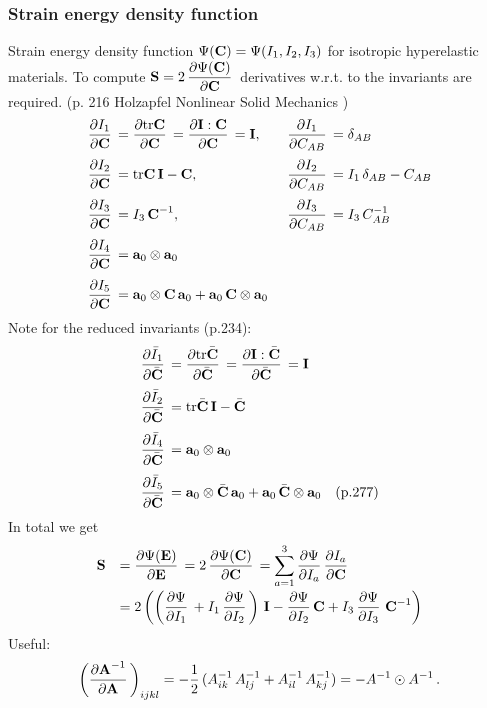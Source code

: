 \subsubsection{Strain energy density function}
Strain energy density function $\Psi(\textbf{C}) = \Psi(I_1, I_2, I_3)$ for isotropic hyperelastic materials. To compute $\bfS = 2\,\p{\Psi(\bfC)}{\bfC}$ derivatives w.r.t. to the invariants are required. (p. 216 Holzapfel Nonlinear Solid Mechanics  \cite{holzapfel2000nonlinear})
\begin{equation*}
  \begin{array}{lll}
    \p{I_1}{\bfC} = \p{\tr\bfC}{\bfC} = \p{\bfI:\bfC}{\bfC} = \bfI, \quad &\p{I_1}{C_{AB}} = \delta_{AB}\\[4mm]
    \p{I_2}{\bfC} = \tr \bfC\,\bfI - \bfC, \quad &\p{I_2}{C_{AB}} = I_1\,\delta_{AB} - C_{AB}\\[4mm]
    \p{I_3}{\bfC} = I_3\,\bfC^{-1}, \quad &\p{I_3}{C_{AB}} = I_3\,C^{-1}_{AB}\\[4mm]
    \p{I_4}{\bfC} = \bfa_0 \otimes \bfa_0\\[4mm]
    \p{I_5}{\bfC} = \bfa_0 \otimes \bfC\,\bfa_0 + \bfa_0\,\bfC \otimes \bfa_0
  \end{array}
\end{equation*}
Note for the reduced invariants (p.234):
\begin{equation*}
  \begin{array}{lll}
    \p{\bar{I}_1}{\bar\bfC} = \p{\tr\bar\bfC}{\bar\bfC} = \p{\bfI:\bar\bfC}{\bar\bfC} = \bfI\\[4mm]
    \p{\bar I_2}{\bar\bfC} = \tr \bar\bfC\,\bfI - \bar\bfC\\[4mm]
    \p{\bar I_4}{\bar\bfC} = \bfa_0 \otimes \bfa_0\\[4mm]
    \p{\bar I_5}{\bar\bfC} = \bfa_0 \otimes \bar\bfC\,\bfa_0 + \bfa_0\,\bar\bfC \otimes \bfa_0  \quad \text{(p.277)}
  \end{array}
\end{equation*}
In total we get
\begin{equation*}
  \begin{array}{lll}
    \bfS &=  \p{\Psi(\bfE)}{\bfE} = 2\,\p{\Psi(\bfC)}{\bfC} = \ds\s{a=1}{3}\p{\Psi}{I_a}\p{I_a}{\bfC}\\[4mm]
     &= 2\left(\left(\p{\Psi}{I_1} + I_1\,\p{\Psi}{I_2}\right)\,\bfI - \p{\Psi}{I_2}\bfC + I_3\,\p{\Psi}{I_3} \,\bfC^{-1}\right)
  \end{array}
\end{equation*}
Useful:
\begin{equation*}
  \begin{array}{lll}
    \left( \p{\bfA^{-1}}{\bfA} \right)_{ijkl} = -\dfrac12(A^{-1}_{ik}\,A^{-1}_{lj} + A^{-1}_{il}\,A^{-1}_{kj}) = -A^{-1}\odot A^{-1}\,.
  \end{array}
\end{equation*}
